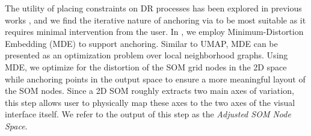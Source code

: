 %
%
%
%
%
%
The utility of placing constraints on DR processes has been explored in previous works \cite{vu_integrating_2022}, and we find the iterative nature of anchoring via to be most suitable as it requires minimal intervention from the user.
%
%
In \ClimateSOM, we employ Minimum-Distortion Embedding (MDE)\cite{agrawal2021minimum} to support anchoring.
%
Similar to UMAP\cite{mcinnes2018umap}, MDE can be presented as an optimization problem over local neighborhood graphs.
%
%
%
Using MDE, we optimize for the distortion of the SOM grid nodes in the 2D space while anchoring points in the output space to ensure a more meaningful layout of the SOM nodes.
%
Since a 2D SOM roughly extracts two main axes of variation, this step allows user to physically map these axes to the two axes of the visual interface itself.
%
We refer to the output of this step as the \textit{Adjusted SOM Node Space}.

